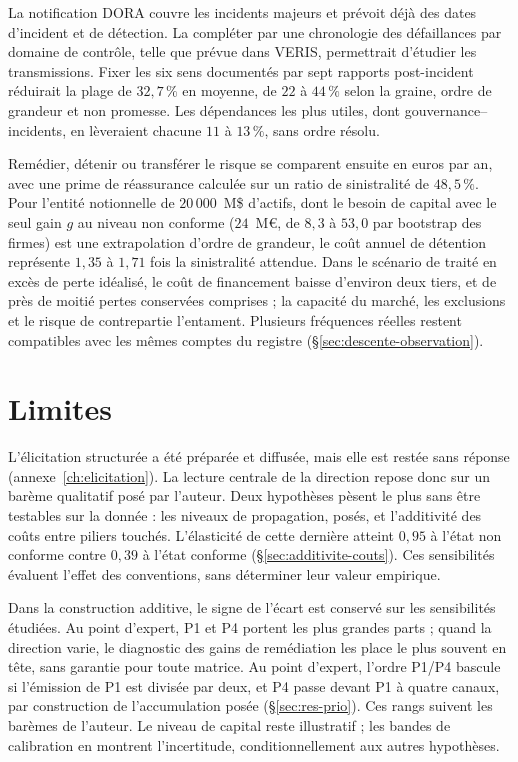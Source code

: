 La notification DORA couvre les incidents majeurs et prévoit déjà des dates d'incident et de détection.
La compléter par une chronologie des défaillances par domaine de contrôle, telle que prévue dans VERIS,
permettrait d'étudier les transmissions. Fixer les six sens documentés par sept rapports post-incident
réduirait la plage de $32{,}7\,\%$ en moyenne, de $22$ à $44\,\%$ selon la graine,
ordre de grandeur et non promesse. Les dépendances les plus utiles, dont
gouvernance--incidents, en lèveraient chacune $11$ à $13\,\%$, sans ordre résolu.


Remédier, détenir ou transférer le risque se comparent ensuite en euros par an, avec une prime de réassurance
calculée sur un ratio de sinistralité de $48{,}5\,\%$. Pour l'entité notionnelle de $20\,000$~M\$ d'actifs,
dont le besoin de capital avec le seul gain $g$ au niveau non conforme ($24$~M\euro{}, de $8{,}3$ à $53{,}0$ par bootstrap des firmes) est une extrapolation d'ordre de grandeur, le coût annuel
de détention représente $1{,}35$ à $1{,}71$ fois la sinistralité attendue. Dans le scénario de traité en excès de perte idéalisé, le coût de financement baisse d'environ deux tiers, et de près de moitié pertes conservées comprises ; la capacité du marché, les
exclusions et le risque de contrepartie l'entament. Plusieurs fréquences réelles restent compatibles
avec les mêmes comptes du registre (\S\ref{sec:descente-observation}).




\section*{Limites}
L'élicitation structurée a été préparée et diffusée, mais elle est restée sans réponse (annexe~\ref{ch:elicitation}). La lecture centrale de la direction repose donc sur un barème
qualitatif posé par l'auteur. Deux hypothèses pèsent le plus sans être testables sur la donnée : les niveaux de
propagation, posés, et l'additivité des coûts entre piliers touchés. L'élasticité de cette dernière atteint $0{,}95$ à
l'état non conforme contre $0{,}39$ à l'état conforme (\S\ref{sec:additivite-couts}).
Ces sensibilités évaluent l'effet des conventions, sans déterminer leur valeur empirique.

Dans la construction additive, le signe de l'écart est conservé sur les sensibilités étudiées.
Au point d'expert, P1 et P4 portent les plus grandes parts ; quand la direction varie, le diagnostic
des gains de remédiation les place le plus souvent en tête, sans garantie pour toute matrice.
Au point d'expert, l'ordre P1/P4 bascule si l'émission de P1 est divisée par deux, et P4 passe devant P1 à quatre canaux, par construction de l'accumulation posée (\S\ref{sec:res-prio}). Ces rangs suivent les barèmes de l'auteur.
Le niveau de capital reste illustratif ; les bandes de calibration
en montrent l'incertitude, conditionnellement aux autres hypothèses.

